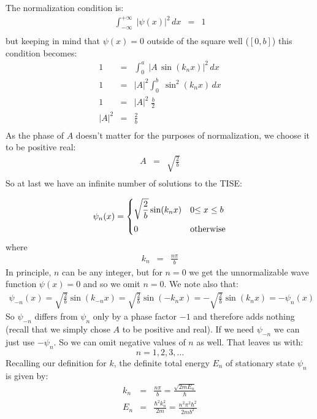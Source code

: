 \documentclass[12pt]{book}
\begin{document}
The normalization condition is:
\begin{eqnarray*}
\int_{-\infty}^{+\infty} \; |\psi(x)|^2 \, dx &=& 1 \\
\end{eqnarray*}
but keeping in mind that $\psi(x)=0$ outside of the square well ($[0,b]$) this condition becomes:
\begin{eqnarray*}
1 &=& \int_{0}^{a} \; |A \, \sin(k_n x)|^2 \, dx \\
1 &=& |A|^2 \int_{0}^{b} \; \sin^2(k_n x) \, dx \\
1 &=& |A|^2 \; \frac{b}{2} \\
|A|^2 &=& \frac{2}{b} \\
\end{eqnarray*}
As the phase of $A$ doesn't matter for the purposes of normalization, we choose it to be positive real:
\begin{eqnarray*}
A &=& \sqrt{\frac{2}{b}} \\
\end{eqnarray*}
So at last we have an infinite number of solutions to the TISE:

\begin{equation}
\label{eqn:psin-isw}
\psi_n(x) = 
\begin{cases}    
   {\displaystyle \sqrt{\frac{2}{b}}\sin(k_n x)} & 0 {\displaystyle \leq x \leq b} \\[8pt]
   0 & {\rm otherwise} \\
\end{cases}   
\end{equation}
where
\begin{eqnarray*}
k_n&=&\frac{n\pi}{b}
\end{eqnarray*}
In principle, $n$ can be any integer, but for $n=0$ we get the unnormalizable wave function $\psi(x)=0$ and so we omit $n=0$.  We note also that:
\begin{eqnarray*}
\psi_{-n}(x) = \sqrt{\frac{2}{b}} \sin(k_{-n}x) = \sqrt{\frac{2}{b}} \sin(-k_{n}x) = -\sqrt{\frac{2}{b}} \sin(k_{n}x) = -\psi_{n}(x)
\end{eqnarray*}
So $\psi_{-n}$ differs from $\psi_{n}$ only by a phase factor $-1$ and therefore adds nothing (recall that we simply chose $A$ to be positive and real).  If we need $\psi_{-n}$ we can just use $-\psi_n$.
So we can omit negative values of $n$ as well.  That leaves us with:
\begin{equation*}
n = 1,2,3,\ldots
\end{equation*}
Recalling our definition for $k$, the definite total energy $E_n$ of stationary state $\psi_n$ is given by:
\begin{eqnarray}
k_n &=& \frac{n\pi}{b} = \frac{\sqrt{2mE_n}}{\hbar}\\[10pt]
E_n &=& \frac{\hbar^2k_n^2}{2m}= \frac{n^2 \pi^2 \hbar^2}{2mb^2}
\end{eqnarray}
\end{document}
